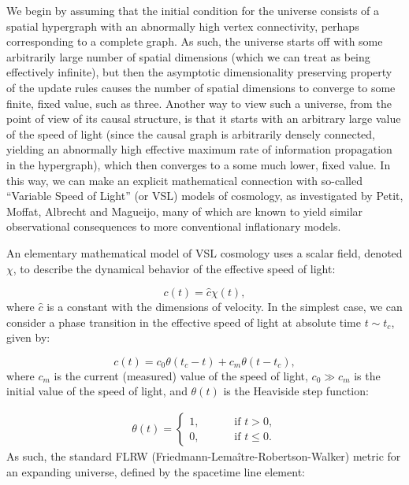 \documentclass{article}
\begin{document}
We begin by assuming that the initial condition for the universe consists of a spatial hypergraph with an abnormally high vertex connectivity, perhaps corresponding to a complete graph. As such, the universe starts off with some arbitrarily large number of spatial dimensions (which we can treat as being effectively infinite), but then the asymptotic dimensionality preserving property of the update rules causes the number of spatial dimensions to converge to some finite, fixed value, such as three. Another way to view such a universe, from the point of view of its causal structure, is that it starts with an arbitrary large value of the speed of light (since the causal graph is arbitrarily densely connected, yielding an abnormally high effective maximum rate of information propagation in the hypergraph), which then converges to a some much lower, fixed value. In this way, we can make an explicit mathematical connection with so-called ``Variable Speed of Light'' (or VSL) models of cosmology, as investigated by Petit, Moffat, Albrecht and Magueijo\cite{petit}\cite{petit2}\cite{petit3}\cite{moffat}\cite{moffat2}\cite{albrecht}, many of which are known to yield similar observational consequences to more conventional inflationary models.

An elementary mathematical model of VSL cosmology uses a scalar field, denoted ${\chi}$, to describe the dynamical behavior of the effective speed of light:

\begin{equation}
c \left( t \right) = \hat{c} \chi \left( t \right),
\end{equation}
where ${\hat{c}}$ is a constant with the dimensions of velocity. In the simplest case, we can consider a phase transition in the effective speed of light at absolute time ${t \sim t_c}$, given by:

\begin{equation}
c \left( t \right) = c_0 \theta \left( t_c - t \right) + c_m \theta \left( t - t_c \right),
\end{equation}
where ${c_m}$ is the current (measured) value of the speed of light, ${c_0 \gg c_m}$ is the initial value of the speed of light, and ${\theta \left( t \right)}$ is the Heaviside step function:

\begin{align}
\theta \left( t \right) = \begin{cases}
1, \qquad & \text{ if } t > 0,\\
0, \qquad & \text{ if } t \leq 0.
\end{cases}
\end{align}
As such, the standard FLRW (Friedmann-Lema\^itre-Robertson-Walker) metric for an expanding universe, defined by the spacetime line element:
\end{document}
